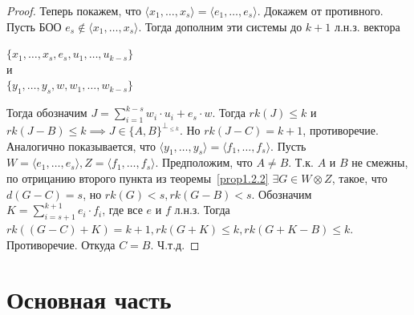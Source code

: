 \documentclass{article}
\begin{document}
\begin{proof}
    Теперь покажем, что $\langle x_1, \dots, x_s\rangle = \langle e_1, \dots, e_s\rangle$.
    Докажем от противного. 
    Пусть БОО $e_s \not\in \langle x_1, \dots, x_s\rangle$.
    Тогда дополним эти системы до $k + 1$ л.н.з. вектора
    \begin{center}
        $\{x_1, \dots, x_s, e_s, u_1, \dots, u_{k - s}\}$ \\
        и \\
        $\{y_1, \dots, y_s, w, w_1, \dots, w_{k - s}\}$
    \end{center}
    Тогда обозначим $J = \sum\limits_{i = 1}^{k - s}w_i \cdot u_i + e_s \cdot w$. Тогда $rk(J) \le k$ и $rk(J-B) \le k \implies J \in \{A, B\}^{\perp_{\le k}}$. Но $rk(J - C) = k + 1$, противоречие. Аналогично показывается, что $\langle y_1, \dots, y_s \rangle = \langle f_1, \dots, f_s\rangle$. Пусть $W = \langle e_1, \dots, e_s \rangle, Z = \langle f_1, \dots, f_s \rangle$. Предположим, что $A \ne B$. Т.к. $A$ и $B$ не смежны, по отрицанию второго пункта из теоремы~\ref{prop1.2.2} $\exists G \in W \otimes Z$, такое, что $d(G - C) = s$, но $rk(G) < s, rk(G-B) < s$. Обозначим $K = \sum\limits_{i = s + 1}^{k + 1}{e_i \cdot f_i}$, где все $e$ и $f$ л.н.з. Тогда $rk((G-C) +K) = k +1, rk(G + K) \le k, rk(G + K - B) \le k$. Противоречие. Откуда $C = B$. Ч.т.д.
\end{proof}

\section{Основная часть}
\end{document}
